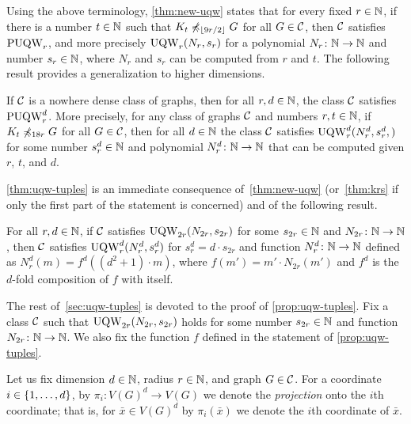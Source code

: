 \medskip
	Using the above terminology, \cref{thm:new-uqw}
	states that for every fixed $r\in\N$, if there is a number $t\in\N$
	such that $K_t\not\minor_{\lfloor 9r/2\rfloor} G$ for all $G\in \cal C$,
	then $\cal C$ satisfies $\puqw_r$,
	and more precisely $\uqw_r(N_r,s_r)$
	for a polynomial $N_r\from\N\to\N$ and number $s_r\in \N$, where $N_r$ and $s_r$ can be computed from $r$ and $t$.
	The following result provides a generalization to higher dimensions.

\begin{theorem}\label{thm:uqw-tuples}If $\cal C$
	is a nowhere dense class of graphs,
	then for all $r,d\in\N$,
	the class $\cal C$ satisfies
	 $\puqw^d_r$.
	More precisely, for any class of graphs $\cal C$ and numbers $r,t\in\N$,
	if  	$K_t\not\minor_{18r} G$ for all $G\in \cal C$,
then for all $d\in \N$ the class $\cal C$ satisfies $\uqw^d_{r}(N^d_r,s^d_r,)$	for 
some number $s^d_r\in \N$ and polynomial $N^d_r\from \N\to\N$ that can be computed given $r$, $t$, and $d$.
\end{theorem}


\cref{thm:uqw-tuples} is an immediate consequence  of~\cref{thm:new-uqw} (or~\cref{thm:krs} if only the first part of the statement is concerned)
and of the following result.

\begin{proposition}\label{prop:uqw-tuples}
For all $r,d\in\N$,
if $\cal C$ satisfies $\uqw_{2r}(N_{2r},s_{2r})$ 
for some $s_{2r}\in\N$ and \mbox{$N_{2r}\colon\N\to \N$},
then $\cal C$
satisfies $\uqw^d_r(N^d_r,s^d_r)$
for  $s^d_r=d\cdot s_{2r}$ and 
function $N^d_r\colon \N\to \N$ defined as $N^d_r(m)=f^d((d^2+1)\cdot m)$, where $f(m')=m'\cdot N_{2r}(m')$ and $f^d$ is the $d$-fold composition of $f$ with itself.
\end{proposition}


The rest of~\cref{sec:uqw-tuples} is devoted to the proof of \cref{prop:uqw-tuples}.
Fix a class $\cal C$
such that $\uqw_{2r}(N_{2r},s_{2r})$ holds for some number $s_{2r}\in \N$ and  function $N_{2r}\from \N\to \N$.
We also fix the function $f$ defined in the statement of \cref{prop:uqw-tuples}.


\medskip

	Let us fix dimension $d\in \N$, radius $r\in \N$, and graph $G\in \cal C$.
        For a coordinate $i\in\set{1,\ldots,d}$, by $\pi_i\colon V(G)^d\to V(G)$ we denote the {\em{projection}} onto the $i$th coordinate; that is,
        for $\bar{x}\in V(G)^d$ by $\pi_i(\bar{x})$ we denote the $i$th coordinate of $\bar{x}$.
        

